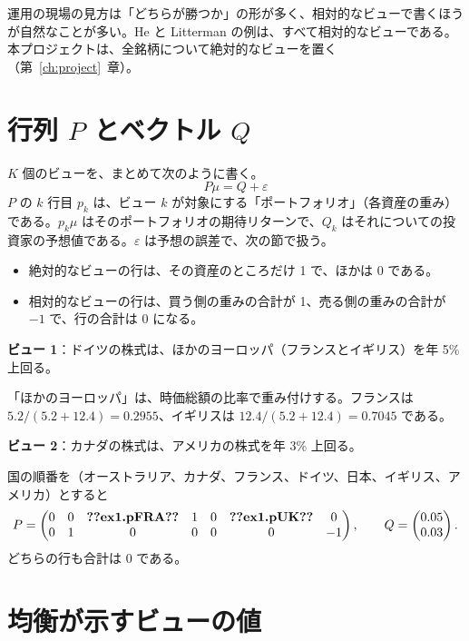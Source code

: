 \documentclass[xelatex,ja=standard,jafont=hiragino-pron,a4paper,11pt,openany]{bxjsreport}
\makeatletter
\newcommand{\V}[1]{\ifcsname v@#1\endcsname\csname v@#1\endcsname\else\textbf{??#1??}\fi}
\newcommand{\chapref}[1]{第~\ref{#1}~章}
\makeatother
\begin{document}
運用の現場の見方は「どちらが勝つか」の形が多く、相対的なビューで書くほうが自然なことが多い。He と Litterman の例は、すべて相対的なビューである。本プロジェクトは、全銘柄について絶対的なビューを置く（\chapref{ch:project}）。

\section{行列 $P$ とベクトル $Q$}

$K$ 個のビューを、まとめて次のように書く。
\begin{equation}
P\mu = Q + \varepsilon
\label{eq:view}
\end{equation}
$P$ の $k$ 行目 $p_k$ は、ビュー $k$ が対象にする「ポートフォリオ」（各資産の重み）である。$p_k\mu$ はそのポートフォリオの期待リターンで、$Q_k$ はそれについての投資家の予想値である。$\varepsilon$ は予想の誤差で、次の節で扱う。

\begin{itemize}
\item 絶対的なビューの行は、その資産のところだけ 1 で、ほかは 0 である。
\item 相対的なビューの行は、買う側の重みの合計が 1、売る側の重みの合計が $-1$ で、行の合計は 0 になる。
\end{itemize}

\begin{exbox}
\textbf{ビュー 1}：ドイツの株式は、ほかのヨーロッパ（フランスとイギリス）を年 5\% 上回る。

「ほかのヨーロッパ」は、時価総額の比率で重み付けする。フランスは $5.2/(5.2+12.4) = 0.2955$、イギリスは $12.4/(5.2+12.4) = 0.7045$ である。

\textbf{ビュー 2}：カナダの株式は、アメリカの株式を年 3\% 上回る。

国の順番を（オーストラリア、カナダ、フランス、ドイツ、日本、イギリス、アメリカ）とすると
\[
P = \begin{pmatrix}
0 & 0 & \V{ex1.pFRA} & 1 & 0 & \V{ex1.pUK} & 0 \\
0 & 1 & 0 & 0 & 0 & 0 & -1
\end{pmatrix},\qquad
Q = \begin{pmatrix} 0.05 \\ 0.03 \end{pmatrix}.
\]
どちらの行も合計は 0 である。
\end{exbox}

\section{均衡が示すビューの値}\label{sec:impliedview}
\end{document}
